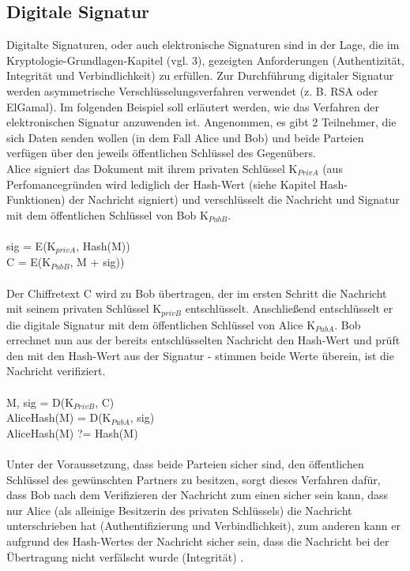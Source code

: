\documentclass[10pt, a4paper,headsepline,pointednumbers]{scrreprt}
\begin{document}
\subsection{Digitale Signatur}
Digitalte Signaturen, oder auch elektronische Signaturen sind in der Lage, die im Kryptologie-Grundlagen-Kapitel (vgl.  3), gezeigten Anforderungen (Authentizität, Integrität und Verbindlichkeit) zu erfüllen. Zur Durchführung digitaler Signatur werden asymmetrische Verschlüsselungsverfahren verwendet (z. B. RSA oder ElGamal). Im folgenden Beispiel soll erläutert werden, wie das Verfahren der elektronischen Signatur anzuwenden ist. Angenommen, es gibt 2 Teilnehmer, die sich Daten senden wollen (in dem Fall Alice und Bob) und beide Parteien verfügen über den jeweils öffentlichen Schlüssel des Gegenübers. \\
Alice signiert das Dokument mit ihrem privaten Schlüssel K$_{PrivA}$ (aus Perfomancegründen wird lediglich der Hash-Wert (siehe Kapitel Hash-Funktionen) der Nachricht signiert) und verschlüsselt die Nachricht und Signatur mit dem öffentlichen Schlüssel von Bob K$_{PubB}$. \\ \\
sig =  E(K$_{privA}$, Hash(M)) \\
C = E(K$_{PubB}$, M + sig)) \\ \\
Der Chiffretext C wird zu Bob übertragen, der im ersten Schritt die Nachricht mit seinem privaten Schlüssel K$_{privB}$ entschlüsselt. Anschließend entschlüsselt er die digitale Signatur mit dem öffentlichen Schlüssel von Alice K$_{PubA}$. Bob errechnet nun aus der bereits entschlüsselten Nachricht den Hash-Wert und prüft den mit den Hash-Wert aus der Signatur - stimmen beide Werte überein, ist die Nachricht verifiziert. \\ \\
M, sig = D(K$_{PrivB}$, C) \\
AliceHash(M) = D(K$_{PubA}$, sig) \\
AliceHash(M) ?= Hash(M) \\ \\
Unter der Voraussetzung, dass beide Parteien sicher sind, den öffentlichen Schlüssel des gewünschten Partners zu besitzen, sorgt dieses Verfahren dafür, dass Bob nach dem Verifizieren der Nachricht zum einen sicher sein kann, dass nur Alice (als alleinige Besitzerin des privaten Schlüssels) die Nachricht unterschrieben hat (Authentifizierung und Verbindlichkeit), zum anderen kann er aufgrund des Hash-Wertes der Nachricht sicher sein, dass die Nachricht bei der Übertragung nicht verfälscht wurde (Integrität) \citep[S. 391ff]{book:it-sicherheit}.
\end{document}
